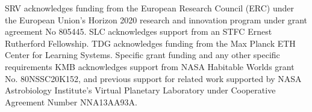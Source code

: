 \documentclass[
    usenatbib,
]{mnras}
\begin{document}
SRV acknowledges funding from the European Research Council (ERC) under the European Union’s Horizon 2020 research and innovation program under grant agreement No 805445.
SLC acknowledges support from an STFC Ernest Rutherford Fellowship. 
TDG acknowledges funding from the Max Planck ETH Center for Learning Systems.
Specific grant funding and any other specific requirements
KMB acknowledges support from NASA Habitable
Worlds grant No. 80NSSC20K152, and previous support for related work supported by NASA Astrobiology Institute's Virtual Planetary Laboratory under Cooperative Agreement Number NNA13AA93A.



\end{document}

